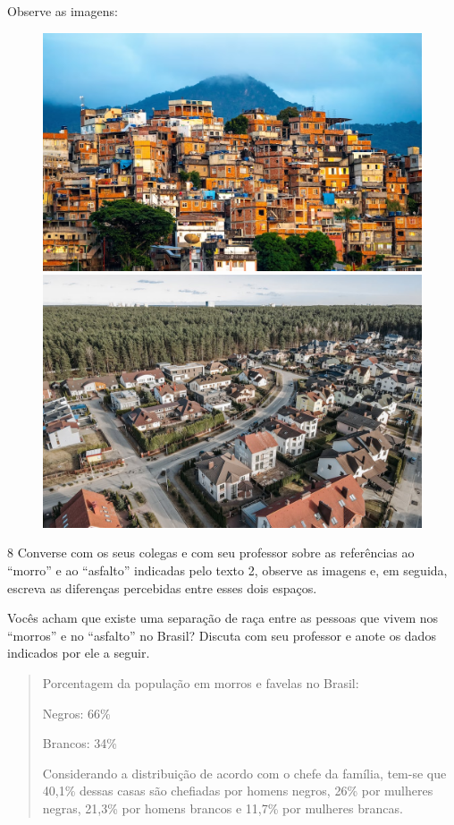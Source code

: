 \pagebreak
Observe as imagens:

\begin{figure}[htpb!]
\includegraphics[width=.5\textwidth]{./imgs/img41.png}
\includegraphics[width=.47\textwidth]{./imgs/img42.png}
\end{figure}


\num{8} Converse com os seus colegas e com seu professor sobre as referências ao
“morro” e ao “asfalto” indicadas pelo texto 2, observe as imagens e, em
seguida, escreva as diferenças percebidas entre esses dois espaços.


\noindent{}Vocês acham que existe uma separação de raça entre as pessoas que vivem
nos “morros” e no “asfalto” no Brasil? Discuta com seu professor e anote
os dados indicados por ele a seguir.

\begin{quote}
Porcentagem da população em morros e favelas no Brasil:

Negros: 66\%

Brancos: 34\%

Considerando a distribuição de acordo com o chefe da família, tem-se que
40,1\% dessas casas são chefiadas por homens negros, 26\% por mulheres
negras, 21,3\% por homens brancos e 11,7\% por mulheres brancas.
\end{quote}

